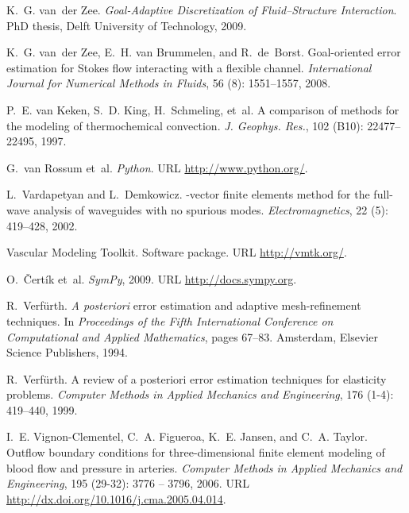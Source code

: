 \begin{thebibliography}{467}
K.~G. van~der Zee.
\newblock \emph{Goal-Adaptive Discretization of Fluid--Structure Interaction}.
\newblock PhD thesis, Delft University of Technology, 2009.

K.~G. van~der Zee, E.~H. van Brummelen, and R.~de~Borst.
\newblock Goal-oriented error estimation for {S}tokes flow interacting with a
  flexible channel.
\newblock \emph{International Journal for Numerical Methods in Fluids},
  56 (8): 1551--1557, 2008.

P.~E. van Keken, S.~D. King, H.~Schmeling, et~al.
\newblock A comparison of methods for the modeling of thermochemical
  convection.
\newblock \emph{J. Geophys. Res.}, 102 (B10): 22477--22495,
  1997.

G.~van Rossum et~al.
\newblock \emph{Python}.
\newblock URL \url{http://www.python.org/}.

L.~Vardapetyan and L.~Demkowicz.
-vector finite elements method for the full-wave analysis of
  waveguides with no spurious modes.
\newblock \emph{Electromagnetics}, 22 (5): 419--428, 2002.

{Vascular Modeling Toolkit}.
\newblock Software package.
\newblock URL \url{http://vmtk.org/}.

O.~\v{C}ert\'{i}k et~al.
\newblock \emph{{SymPy}}, 2009.
\newblock URL \url{http://docs.sympy.org}.

R.~Verf{\"u}rth.
\newblock \emph{A posteriori} error estimation and adaptive mesh-refinement
  techniques.
\newblock In \emph{Proceedings of the Fifth International Conference on
  Computational and Applied Mathematics}, pages 67--83. Amsterdam, Elsevier
  Science Publishers, 1994.

R.~Verf{\"u}rth.
\newblock A review of a posteriori error estimation techniques for elasticity
  problems.
\newblock \emph{Computer Methods in Applied Mechanics and Engineering},
  176 (1-4): 419--440, 1999.

I.~E. Vignon-Clementel, C.~A. Figueroa, K.~E. Jansen, and C.~A. Taylor.
\newblock Outflow boundary conditions for three-dimensional finite element
  modeling of blood flow and pressure in arteries.
\newblock \emph{Computer Methods in Applied Mechanics and Engineering},
  195 (29-32): 3776 -- 3796, 2006.
\newblock URL \url{http://dx.doi.org/10.1016/j.cma.2005.04.014}.


\end{thebibliography}
